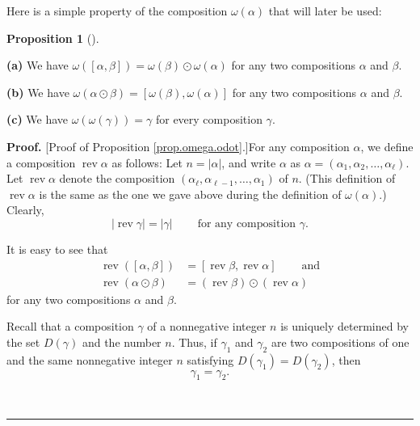 \documentclass[numbers=enddot,12pt,final,onecolumn,notitlepage,abstracton]{scrartcl}%
\theoremstyle{definition}
\newtheorem{prop}[theo]{Proposition}
\newenvironment{proposition}[1][]
{\begin{prop}[#1]\begin{leftbar}}
{\end{leftbar}\end{prop}}
\newenvironment{proof}[1][Proof]{\noindent\textbf{#1.} }{\ \rule{0.5em}{0.5em}}
\newenvironment{verlong}{}{}
\begin{document}
\begin{verlong}
Here is a simple property of the composition $\omega\left(  \alpha\right)  $
that will later be used:

\begin{proposition}
\label{prop.omega.odot}\textbf{(a)} We have $\omega\left(  \left[
\alpha,\beta\right]  \right)  =\omega\left(  \beta\right)  \odot\omega\left(
\alpha\right)  $ for any two compositions $\alpha$ and $\beta$.

\textbf{(b)} We have $\omega\left(  \alpha\odot\beta\right)  =\left[
\omega\left(  \beta\right)  ,\omega\left(  \alpha\right)  \right]  $ for any
two compositions $\alpha$ and $\beta$.

\textbf{(c)} We have $\omega\left(  \omega\left(  \gamma\right)  \right)
=\gamma$ for every composition $\gamma$.
\end{proposition}

\begin{proof}
[Proof of Proposition \ref{prop.omega.odot}.]For any composition $\alpha$, we
define a composition $\operatorname*{rev}\alpha$ as follows: Let $n=\left\vert
\alpha\right\vert $, and write $\alpha$ as $\alpha=\left(  \alpha_{1}%
,\alpha_{2},\ldots,\alpha_{\ell}\right)  $. Let $\operatorname*{rev}\alpha$
denote the composition $\left(  \alpha_{\ell},\alpha_{\ell-1},\ldots
,\alpha_{1}\right)  $ of $n$. (This definition of $\operatorname*{rev}\alpha$
is the same as the one we gave above during the definition of $\omega\left(
\alpha\right)  $.) Clearly,%
\begin{equation}
\left\vert \operatorname*{rev}\gamma\right\vert =\left\vert \gamma\right\vert
\ \ \ \ \ \ \ \ \ \ \text{for any composition }\gamma.
\label{pf.prop.omega.odot.rev0}%
\end{equation}


It is easy to see that%
\begin{align}
\operatorname*{rev}\left(  \left[  \alpha,\beta\right]  \right)   &  =\left[
\operatorname*{rev}\beta,\operatorname*{rev}\alpha\right]
\ \ \ \ \ \ \ \ \ \ \text{and}\label{pf.prop.omega.odot.rev1}\\
\operatorname*{rev}\left(  \alpha\odot\beta\right)   &  =\left(
\operatorname*{rev}\beta\right)  \odot\left(  \operatorname*{rev}%
\alpha\right)  \label{pf.prop.omega.odot.rev2}%
\end{align}
for any two compositions $\alpha$ and $\beta$.

Recall that a composition $\gamma$ of a nonnegative integer $n$ is uniquely
determined by the set $D\left(  \gamma\right)  $ and the number $n$. Thus, if
$\gamma_{1}$ and $\gamma_{2}$ are two compositions of one and the same
nonnegative integer $n$ satisfying $D\left(  \gamma_{1}\right)  =D\left(
\gamma_{2}\right)  $, then%
\begin{equation}
\gamma_{1}=\gamma_{2}. \label{pf.prop.omega.odot.gamma1=2}%
\end{equation}



\end{proof}
\end{verlong}
\end{document}
